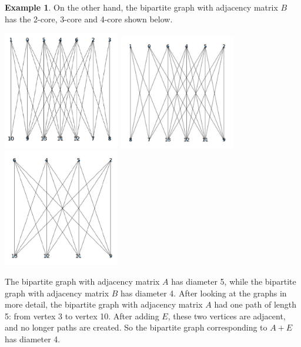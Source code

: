 \documentclass[11pt]{article}
\theoremstyle{definition}
\newtheorem{example}{Example}
\theoremstyle{remark}
\begin{document}
\begin{example}
On the other hand, the bipartite graph with adjacency matrix $B$ has the 2-core, 3-core and 4-core shown below. 

\begin{center}
\includegraphics[width=2in]{./images/2coreB}
\includegraphics[width=2in]{./images/3coreB}
\includegraphics[width=2in]{./images/4coreB}
\end{center}


The bipartite graph with adjacency matrix $A$ has diameter 5, while the bipartite graph with adjacency matrix $B$ has diameter 4. After looking at the graphs in more detail, the bipartite graph with adjacency matrix $A$ had one path of length 5: from vertex 3 to vertex 10. After adding $E$, these two vertices are adjacent, and no longer paths are created. So the bipartite graph corresponding to $A+ E$ has diameter 4. 





           		

\end{example}
\end{document}
